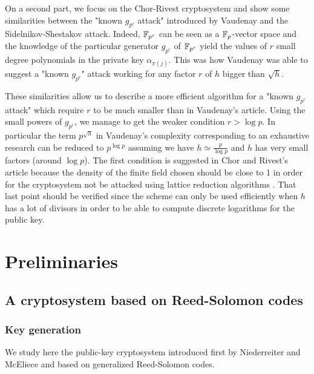 \documentclass[a4paper]{article}
\begin{document}
On a second part, we focus on the Chor-Rivest cryptosystem and show some similarities between the "known $g_{p^r}$ attack" introduced by Vaudenay and the Sidelnikov-Shestakov attack. Indeed, $\mathbb{F}_{p^r}$ can be seen as a $\mathbb{F}_p$-vector space and the knowledge of the particular generator $g_{p^r}$ of $\mathbb{F}_{p^r}$ yield the values of $r$ small degree polynomials in the private key $\alpha_{\pi(j)}$. This was how Vaudenay was able to suggest a "known $g_{p^r}$" attack working for any factor $r$ of $h$ bigger than $\sqrt{h}$.

These similarities allow us to describe a more efficient algorithm for a "known $g_{p^r}$ attack" which require $r$ to be much smaller than in Vaudenay's article. Using the small powers of $g_{p^r}$, we manage to get the weaker condition $r > \log p$. In particular the term $p^{\sqrt{h}}$ in Vaudenay's complexity corresponding to an exhaustive research can be reduced to $p^{\log p}$ assuming we have $h \simeq \frac{p}{\log p}$  and $h$ has very small factors (around $\log p$). The first condition is suggested in Chor and Rivest's article because the density of the  finite field chosen should be close to 1 in order for the cryptosystem not be attacked using lattice reduction algorithms . That last point should be verified since the scheme can only be used efficiently when $h$ has a lot of divisors in order to be able to compute discrete logarithms for the public key.



\newpage
\section{Preliminaries}
\label{sec:Prel}


\subsection{A cryptosystem based on Reed-Solomon codes}
\subsubsection{Key generation}

We study here the public-key cryptosystem introduced first by Niederreiter and McEliece \cite{NiederH86} and based on generalized Reed-Solomon codes.
\end{document}

